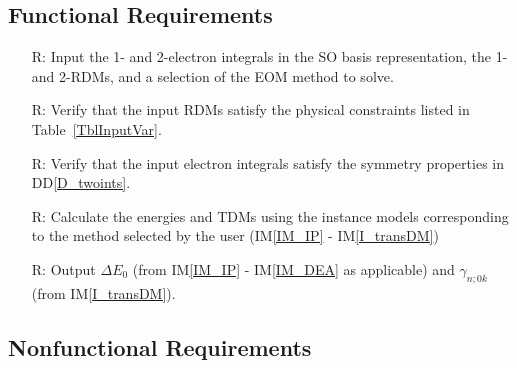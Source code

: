\documentclass[12pt]{article}
\newcommand{\ddref}[1]{DD\ref{#1}}
\newcommand{\iref}[1]{IM\ref{#1}}
\newcounter{reqnum} %
\begin{document}
\subsection{Functional Requirements}

\noindent \begin{itemize}

\item[R\refstepcounter{reqnum}\thereqnum \label{R_Inputs}:] Input the 1- and 
2-electron integrals in the SO basis representation, the 1- and 2-RDMs, and a 
selection of the EOM method to solve.

\item[R\refstepcounter{reqnum}\thereqnum \label{R_VerifyInputs_RDM}:] Verify 
that 
the input RDMs satisfy the physical constraints listed in 
Table~\ref{TblInputVar}.

\item[R\refstepcounter{reqnum}\thereqnum \label{R_VerifyInputs_Ints}:] Verify 
that the input electron integrals satisfy the symmetry properties in 
\ddref{D_twoints}.

\item[R\refstepcounter{reqnum}\thereqnum \label{R_Calculate}:] Calculate the 
energies and TDMs using the instance models corresponding to the method 
selected by the user (\iref{IM_IP} - \iref{I_transDM})

\item[R\refstepcounter{reqnum}\thereqnum \label{R_Output}:] Output $\Delta E_0$ 
(from \iref{IM_IP} - \iref{IM_DEA} as applicable) and $\gamma_{n;0k}$ (from  
\iref{I_transDM}).


\end{itemize}

\subsection{Nonfunctional Requirements}
\end{document}
